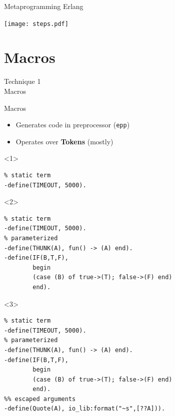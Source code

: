 \documentclass[c]{beamer}
\begin{document}
\begin{frame}[c]{Metaprogramming Erlang}
  \begin{center}
    \texttt{[image: steps.pdf]}
  \end{center}
\end{frame}

\section{Macros}

\begin{frame}[c]
  \begin{center}
    \Huge Technique 1 \\ Macros
  \end{center}
\end{frame}

\begin{frame}[fragile,t]{Macros}
  \begin{itemize}
  \item Generates code in preprocessor (\texttt{epp})
  \item Operates over \textbf{Tokens} (mostly)
  \end{itemize}
  \begin{onlyenv}<1>
    \begin{lstlisting}
% static term
-define(TIMEOUT, 5000).
\end{lstlisting}
  \end{onlyenv}

  \begin{onlyenv}<2>
    \begin{lstlisting}
% static term
-define(TIMEOUT, 5000).
% parameterized
-define(THUNK(A), fun() -> (A) end).
-define(IF(B,T,F),
        begin
        (case (B) of true->(T); false->(F) end)
        end).
\end{lstlisting}
  \end{onlyenv}

  \begin{onlyenv}<3>
    \begin{lstlisting}
% static term
-define(TIMEOUT, 5000).
% parameterized
-define(THUNK(A), fun() -> (A) end).
-define(IF(B,T,F),
        begin
        (case (B) of true->(T); false->(F) end)
        end).
%% escaped arguments
-define(Quote(A), io_lib:format("~s",[??A])).
\end{lstlisting}
  \end{onlyenv}
\end{frame}
\end{document}
